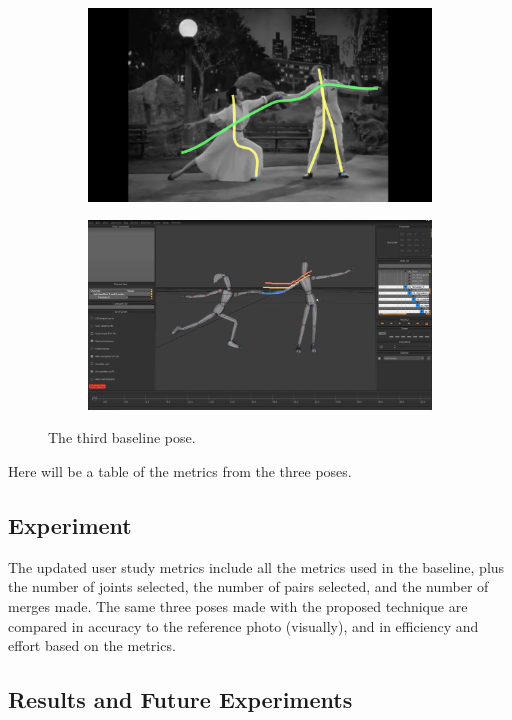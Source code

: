 \begin{figure}[h!]
	\centering
        \begin{subfigure}[b!]{0.45\textwidth}
        	\centering
                \includegraphics[width=\linewidth]{img/keyframe_case_7_(4)}
        \end{subfigure}
        \quad
        \begin{subfigure}[b!]{0.45\textwidth}
        	\centering
                \includegraphics[width=\linewidth]{img/baselinepose3}
        \end{subfigure}%
        \caption{The third baseline pose.}
	\label{fig:bpose3}
\end{figure}

Here will be a table of the metrics from the three poses.

\subsection{Experiment}
The updated user study metrics include all the metrics used in the baseline, plus the number of joints selected, the number of pairs selected, and the number of merges made. The same three poses made with the proposed technique are compared in accuracy to the reference photo (visually), and in efficiency and effort based on the metrics.

\subsection{Results and Future Experiments}

